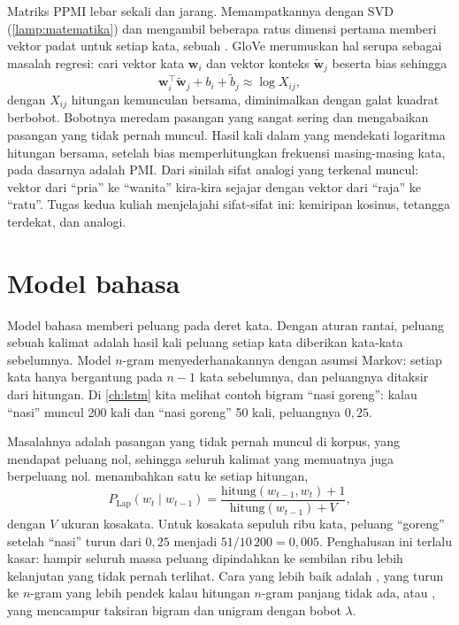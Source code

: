 Matriks PPMI lebar sekali dan jarang. Memampatkannya dengan SVD (\cref{lamp:matematika}) dan mengambil beberapa ratus dimensi
pertama memberi vektor padat untuk setiap kata, sebuah . GloVe \citep{pennington2014} merumuskan hal serupa
sebagai masalah regresi: cari vektor kata $\bm w_i$ dan vektor konteks $\tilde{\bm w}_j$ beserta bias sehingga
\begin{equation}
\bm w_i^\top\tilde{\bm w}_j+b_i+\tilde b_j\approx\log X_{ij},
\end{equation}
dengan $X_{ij}$ hitungan kemunculan bersama, diminimalkan dengan galat kuadrat berbobot. Bobotnya meredam pasangan yang sangat
sering dan mengabaikan pasangan yang tidak pernah muncul. Hasil kali dalam yang mendekati logaritma hitungan bersama, setelah bias
memperhitungkan frekuensi masing-masing kata, pada dasarnya adalah PMI. Dari sinilah sifat analogi yang terkenal muncul: vektor
dari ``pria'' ke ``wanita'' kira-kira sejajar dengan vektor dari ``raja'' ke ``ratu''. Tugas kedua kuliah menjelajahi sifat-sifat ini:
kemiripan kosinus, tetangga terdekat, dan analogi.

\section{Model bahasa}

Model bahasa memberi peluang pada deret kata. Dengan aturan rantai, peluang sebuah kalimat adalah hasil kali peluang setiap kata
diberikan kata-kata sebelumnya. Model $n$-gram menyederhanakannya dengan asumsi Markov: setiap kata hanya bergantung pada $n-1$ kata
sebelumnya, dan peluangnya ditaksir dari hitungan. Di \cref{ch:lstm} kita melihat contoh bigram ``nasi goreng'': kalau ``nasi''
muncul 200 kali dan ``nasi goreng'' 50 kali, peluangnya $0{,}25$.

Masalahnya adalah pasangan yang tidak pernah muncul di korpus, yang mendapat peluang nol, sehingga seluruh kalimat yang memuatnya
juga berpeluang nol.  menambahkan satu ke setiap hitungan,
\begin{equation}
P_{\mathrm{Lap}}(w_t\mid w_{t-1})=\frac{\mathrm{hitung}(w_{t-1},w_t)+1}{\mathrm{hitung}(w_{t-1})+V},
\end{equation}
dengan $V$ ukuran kosakata. Untuk kosakata sepuluh ribu kata, peluang ``goreng'' setelah ``nasi'' turun dari $0{,}25$ menjadi
$51/10\,200=0{,}005$. Penghalusan ini terlalu kasar: hampir seluruh massa peluang dipindahkan ke sembilan ribu lebih kelanjutan
yang tidak pernah terlihat. Cara yang lebih baik adalah , yang turun ke $n$-gram yang lebih pendek kalau hitungan
$n$-gram panjang tidak ada, atau , yang mencampur taksiran bigram dan unigram dengan bobot $\lambda$.

